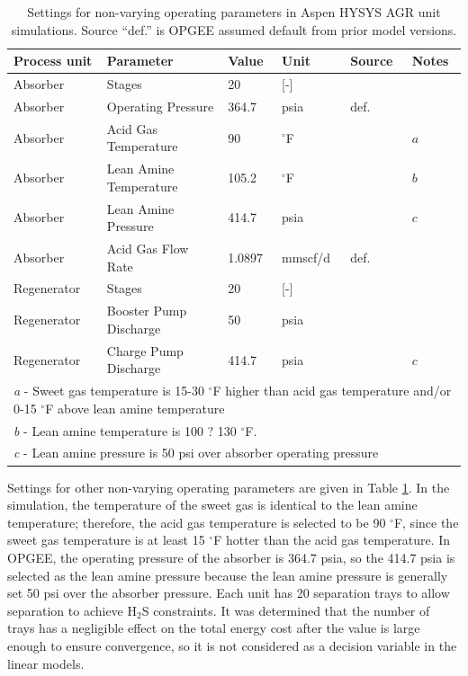 \documentclass[11pt]{report}
\begin{document}
\begin{table}
\begin{scriptsize}
\caption{Settings for non-varying operating parameters in Aspen HYSYS AGR unit simulations. Source ``def.'' is OPGEE assumed default from prior model versions.}
\label{tab:AGR_Aspen_Settings}
\begin{tabular*}{0.95\columnwidth}{p{}p{}p{}p{}p{}p{}}
\toprule
Process unit & Parameter & Value & Unit & Source & Notes \\
\midrule
Absorber &	Stages 				&	20 		& 	[-]		&	 	&\\
Absorber &	Operating Pressure 		&	364.7 	&	psia 		& def.	 	& \\
Absorber &	Acid Gas Temperature 	&	90 		&	$^\circ$F 		&	\cite{Manning1991} 	& $a$ \\
Absorber &	Lean Amine Temperature 	&	105.2 	&	$^\circ$F 		& 	\cite{Manning1991} 	& $b$\\
Absorber &	Lean Amine Pressure 	&	414.7 	&	psia 		&	\cite{Manning1991}	& $c$ \\
Absorber &	Acid Gas Flow Rate 		&	1.0897 	&	mmscf/d 	&	def.	& \\
\midrule
Regenerator &	Stages 				&	20 		&	[-] 		&		&\\
Regenerator &	Booster Pump Discharge 	&	50 		&	psia 		&	\cite{Manning1991}	& \\
Regenerator &	Charge Pump Discharge 	&	414.7 	&	psia 		&	\cite{Manning1991}	& $c$ \\
\bottomrule
\multicolumn{6}{p{0.95\columnwidth}}{\emph{a} - Sweet gas temperature is 15-30 $^\circ$F higher than acid gas temperature and/or 0-15 $^\circ$F above lean amine temperature}\\
\multicolumn{6}{p{0.95\columnwidth}}{\emph{b} - Lean amine temperature is 100 ? 130 $^\circ$F.}\\
\multicolumn{6}{p{0.95\columnwidth}}{\emph{c} - Lean amine pressure is 50 psi over absorber operating pressure}\\
\end{tabular*}
\end{scriptsize}
\end{table}

Settings for other non-varying operating parameters are given in Table \ref{tab:AGR_Aspen_Settings}. In the simulation, the temperature of the sweet gas is identical to the lean amine temperature; therefore, the acid gas temperature is selected to be 90 $^\circ$F, since the sweet gas temperature is at least 15 $^\circ$F hotter than the acid gas temperature. In OPGEE, the operating pressure of the absorber is 364.7 psia, so the 414.7 psia is selected as the lean amine pressure because the lean amine pressure is generally set 50 psi over the absorber pressure. Each unit has 20 separation trays to allow separation to achieve H$_2$S constraints. It was determined that the number of trays has a negligible effect on the total energy cost after the value is large enough to ensure convergence, so it is not considered as a decision variable in the linear models. 
\end{document}
